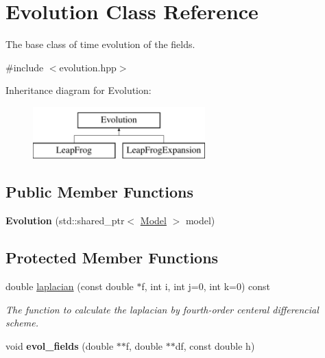 \hypertarget{class_evolution}{}\section{Evolution Class Reference}
\label{class_evolution}


The base class of time evolution of the fields.  




{\ttfamily \#include $<$evolution.\+hpp$>$}

Inheritance diagram for Evolution\+:\begin{figure}[H]
\begin{center}
\leavevmode
\includegraphics[height=2.000000cm]{class_evolution}
\end{center}
\end{figure}
\subsection*{Public Member Functions}
\begin{DoxyCompactItemize}
\item 
\mbox{\label{class_evolution_ab3af50ff7c697e4fa972f7f172b9bd4d}} 
{\bfseries Evolution} (std\+::shared\+\_\+ptr$<$ \mbox{\hyperlink{class_model}{Model}} $>$ model)
\end{DoxyCompactItemize}
\subsection*{Protected Member Functions}
\begin{DoxyCompactItemize}
\item 
double \mbox{\hyperlink{class_evolution_af86656987a077304eacaa56100377be3}{laplacian}} (const double $\ast$f, int i, int j=0, int k=0) const
\begin{DoxyCompactList}\small\item\em The function to calculate the laplacian by fourth-\/order centeral differencial scheme. \end{DoxyCompactList}\item 
\mbox{\label{class_evolution_a27b820875e04d97b58b8e10d0d7ad82d}} 
void {\bfseries evol\+\_\+fields} (double $\ast$$\ast$f, double $\ast$$\ast$df, const double h)
\end{DoxyCompactItemize}
